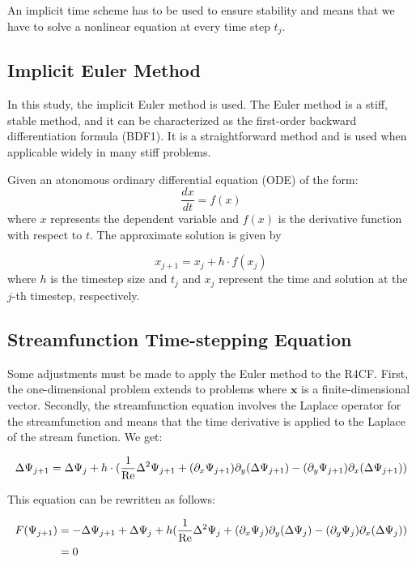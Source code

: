 An implicit time scheme has to be used to ensure stability and means that we
have to solve a nonlinear equation at every time step $t_j$. 

\subsection{Implicit Euler Method}

In this study, the implicit Euler method is used. The Euler method is a stiff,
stable method, and it can be characterized as the first-order backward
differentiation formula (BDF1). It is a straightforward method and is used when
applicable widely in many stiff problems.

Given an atonomous ordinary differential equation (ODE) of the form: \[
\frac{{dx}}{{dt}} = f(x) \] where $x$ represents the dependent variable and
$f(x)$ is the derivative function with respect to $t$. The approximate
solution is given by

\[ x_{j+1} = x_j + h \cdot f(x_j) \] where $h$ is the timestep size and
$t_j$ and $x_j$ represent the time and solution at the $j$-th timestep,
respectively.

\subsection{Streamfunction Time-stepping Equation}

Some adjustments must be made to apply the Euler method to the R4CF. First, the
one-dimensional problem extends to problems where $\mathbf{x}$ is a
finite-dimensional vector. Secondly, the streamfunction equation involves the
Laplace operator for the streamfunction and means that the time derivative is
applied to the Laplace of the stream function. We get:  

\begin{align}
  \Delta\Psi_{j+1} = \Delta\Psi_j + h \cdot (\frac{1}{\mathrm{Re}}\Delta^2 \Psi_{j+1} +
  (\partial_x \Psi_{j+1}) \partial_y(\Delta \Psi_{j+1}) -
  (\partial_y \Psi_{j+1}) \partial_x(\Delta \Psi_{j+1})) \label{eq:str_timestepping}
\end{align}

This equation can be rewritten as follows:

\begin{align}
  F(\Psi_{j+1}) & = - \Delta\Psi_{j+1} + \Delta\Psi_j + h (\frac{1}{\mathrm{Re}}\Delta^2 \Psi_j +
    (\partial_x \Psi_j) \partial_y(\Delta \Psi_j) -
    (\partial_y \Psi_j) \partial_x(\Delta \Psi_j)) \nonumber \\
  & =  0 \label{eq:newton_ts}
\end{align}

